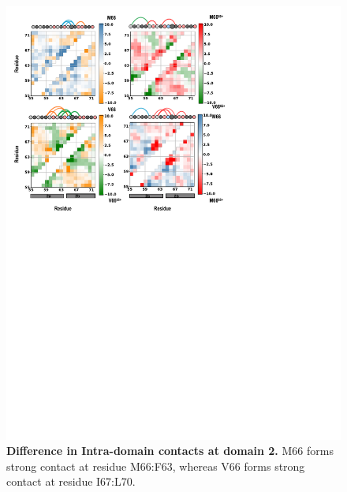 \documentclass[journal=jacsat,manuscript=article]{achemso}
\begin{document}
\begin{figure}[!ht]
\includegraphics[scale=0.2,width=12cm,trim={0 0cm 0 0cm},clip]{../figures/fig-3-2.pdf}

\caption{{\bf Difference in Intra-domain contacts at domain 2.}
M66 forms strong contact at residue M66:F63, whereas V66 forms strong contact at residue I67:L70.}
\label{fig5} 
\end{figure}
\end{document}
